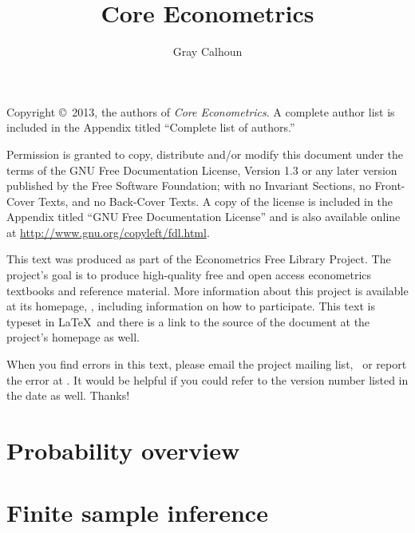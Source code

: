 \documentclass[oneside,openany,notitlepage]{tufte-book}
\title{Core Econometrics}
\author{Gray Calhoun}
\begin{document}
\maketitle

\bigskip\noindent%
Copyright \copyright\ 2013, the authors of \textit{Core Econometrics}.
A complete author list is included in the Appendix titled ``Complete
list of authors.''

Permission is granted to copy, distribute and/or modify this document
under the terms of the GNU Free Documentation License, Version 1.3 or
any later version published by the Free Software Foundation; with no
Invariant Sections, no Front-Cover Texts, and no Back-Cover Texts.  A
copy of the license is included in the Appendix titled ``GNU Free
Documentation License'' and is also available online at
\url{http://www.gnu.org/copyleft/fdl.html}.

This text was produced as part of the Econometrics Free Library
Project.  The project's goal is to produce high-quality free and
open access econometrics textbooks and reference material.  More
information about this project is available at its homepage,
\homepage, including information on how
to participate.  This text is typeset in \LaTeX\ and there is a link
to the source of the document at the project's homepage as well.

\addciteinfo %

When you find errors in this text, please email the project mailing
list, \maillist\ or report the error at \bugtrack.  It would be
helpful if you could refer to the version number listed in the date as
well.  Thanks!

\tableofcontents
\listoftables
\listoffigures

\part{Probability overview}




\part{Finite sample inference}










\end{document}
